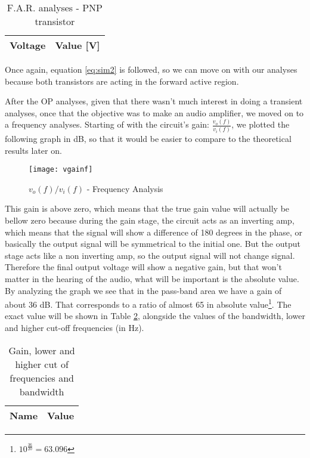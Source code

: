 \FloatBarrier
\begin{table}[ht]
	\centering
	\begin{tabular}{|c|c|}
		\hline    
		{\bf Voltage} & {\bf Value [V]} \\ \hline
				
	\end{tabular}
	\caption{F.A.R. analyses - PNP transistor}
	\label{tab:ngspice4}
\end{table}
\FloatBarrier

Once again, equation \ref{eq:sim2} is followed, so we can move on with our analyses because both transistors are acting in the forward active region.

After the OP analyses, given that there wasn't much interest in doing a transient analyses, once that the objective was to make an audio amplifier, we moved on to a frequency analyses. 
Starting of with the circuit's gain: $\frac{v_o(f)}{v_i(f)}$, we plotted the following graph in dB, so that it would be easier to compare to the theoretical results later on.

\FloatBarrier
\begin{figure}[h] 
	\centering
	\texttt{[image: vgainf]}
	\caption{$v_o(f)/v_i(f)$ - Frequency Analysis}
	\label{fig:venvelope}
\end{figure}
\FloatBarrier

This gain is above zero, which means that the true gain value will actually be bellow zero because during the gain stage, the circuit acts as an inverting amp, which means that the signal will show a difference of 180 degrees in the phase, or basically the output signal will be symmetrical to the initial one. But the output stage acts like a non inverting amp, so the output signal will not change signal. Therefore the final output voltage will show a negative gain, but that won't matter in the hearing of the audio, what will be important is the absolute value. By analyzing the graph we see that in the pass-band area we have a gain of about 36 dB. That corresponds to a ratio of almost 65 in absolute value\footnote{$10^{\frac{36}{20}}= 63.096$}. The exact value will be shown in Table \ref{tab:ngspice5}, alongside the values of the bandwidth, lower and higher cut-off frequencies (in Hz).

\FloatBarrier
\begin{table}[ht]
	\centering
	\begin{tabular}{|c|c|}
		\hline    
		{\bf Name} & {\bf Value} \\ \hline
				
	\end{tabular}
	\caption{Gain, lower and higher cut of frequencies and bandwidth}
	\label{tab:ngspice5}
\end{table}
\FloatBarrier


